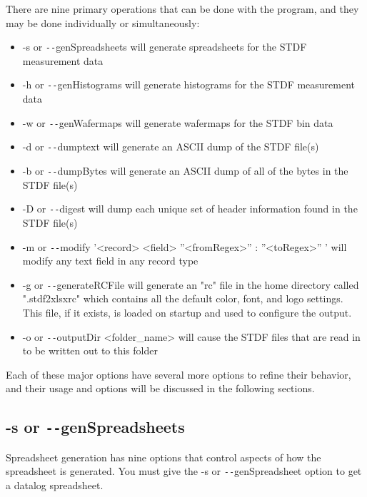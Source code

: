 \documentclass[letterpaper]{article}
\begin{document}
\noindent
There are nine primary operations that can be done with the program, and they may be
done individually or simultaneously:
\begin{itemize}
\item -s or \texttt{-{}-}genSpreadsheets will generate spreadsheets for the STDF measurement data
\item -h or \texttt{-{}-}genHistograms will generate histograms for the STDF measurement data
\item -w or \texttt{-{}-}genWafermaps will generate wafermaps for the STDF bin data
\item -d or \texttt{-{}-}dumptext will generate an ASCII dump of the STDF file(s)
\item -b or \texttt{-{}-}dumpBytes will generate an ASCII dump of all of the bytes in the STDF file(s)
\item -D or \texttt{-{}-}digest will dump each unique set of header information found in the STDF file(s)
\item -m or \texttt{-{}-}modify '<record> <field> ''<fromRegex>'' : ''<toRegex>'' ' will modify any text field in any record type 
\item -g or \texttt{-{}-}generateRCFile will generate an "rc" file in the home directory called ".stdf2xlsxrc"
              which contains all the default color, font, and logo settings.  This file, if it exists, is loaded
              on startup and used to configure the output.
\item -o or \texttt{-{}-}outputDir <folder\_name> will cause the STDF files that are read in to be written out to this folder
\end{itemize}

\noindent
Each of these major options have several more options to refine their behavior, and their usage
and options will be discussed in the following sections.

\subsection{\bf -s or \texttt{-{}-}genSpreadsheets}
Spreadsheet generation has nine options that control aspects of how the spreadsheet is generated.
You must give the -s or \texttt{-{}-}genSpreadsheet option to get a datalog spreadsheet.
\end{document}
